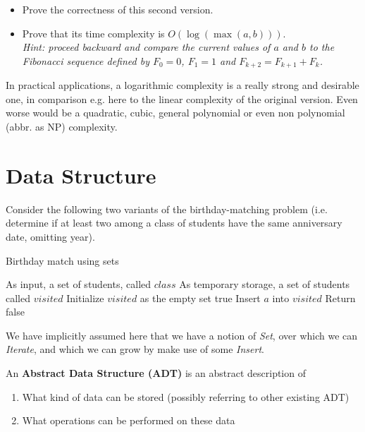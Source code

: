 \documentclass[12pt]{article}
\theoremstyle{plain}
\theoremstyle{remark}
\begin{document}
\begin{itemize}
\item Prove the correctness of this second version.
\item Prove that its time complexity is $O(\log(\max(a, b)))$.\\{\it Hint:
	proceed backward and compare the current values of $a$ and $b$ to the
		Fibonacci sequence defined by $F_0=0$, $F_1=1$ and $F_{k+2} =
		F_{k+1} + F_{k}$.}
\end{itemize}

In practical applications, a logarithmic complexity is a really strong 
and desirable one, in comparison e.g. here to the linear complexity of 
the original version. Even worse would be a quadratic, cubic, general polynomial
or even non polynomial (abbr. as NP) complexity.

\section{Data Structure}

Consider the following two variants of the birthday-matching problem (i.e.
determine if at least two among a class of students have the same anniversary
date, omitting year).

\begin{algorithm}[H]
\caption{Birthday match using sets}
\begin{algorithmic}
\Require As input, a set of students, called $class$
\Require As temporary storage, a set of students called $visited$
\State Initialize $visited$ as the empty set
\State \Return true
\EndIf
\EndFor
\State Insert $a$ into $visited$
\EndFor
\State Return false
\end{algorithmic}
\end{algorithm}

We have implicitly assumed here that we have a notion of {\it Set}, over which we can
{\it Iterate}, and which we can grow by make use of some {\it Insert}.

An {\bf Abstract Data Structure (ADT)} is an abstract description of 
\begin{enumerate}
\item What kind of data can be stored (possibly referring to other existing ADT)
\item What operations can be performed on these data
\end{enumerate}
\end{document}
